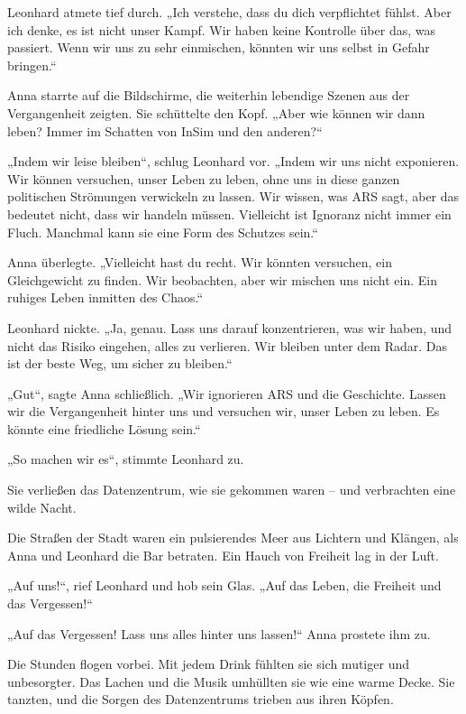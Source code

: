 \documentclass[
]{article}
\begin{document}
Leonhard atmete tief durch. „Ich verstehe, dass du dich verpflichtet fühlst. Aber ich denke, es ist nicht unser Kampf. Wir haben keine Kontrolle über das, was passiert. Wenn wir uns zu sehr einmischen, könnten wir uns selbst in Gefahr bringen.``

Anna starrte auf die Bildschirme, die weiterhin lebendige Szenen aus der Vergangenheit zeigten. Sie schüttelte den Kopf. „Aber wie können wir dann leben? Immer im Schatten von InSim und den anderen?{\kern0pt}``

„Indem wir leise bleiben``, schlug Leonhard vor. „Indem wir uns nicht exponieren. Wir können versuchen, unser Leben zu leben, ohne uns in diese ganzen politischen Strömungen verwickeln zu lassen. Wir wissen, was ARS sagt, aber das bedeutet nicht, dass wir handeln müssen. Vielleicht ist Ignoranz nicht immer ein Fluch. Manchmal kann sie eine Form des Schutzes sein.``

Anna überlegte. „Vielleicht hast du recht. Wir könnten versuchen, ein Gleichgewicht zu finden. Wir beobachten, aber wir mischen uns nicht ein. Ein ruhiges Leben inmitten des Chaos.``

Leonhard nickte. „Ja, genau. Lass uns darauf konzentrieren, was wir haben, und nicht das Risiko eingehen, alles zu verlieren. Wir bleiben unter dem Radar. Das ist der beste Weg, um sicher zu bleiben.``

„Gut``, sagte Anna schließlich. „Wir ignorieren ARS und die Geschichte. Lassen wir die Vergangenheit hinter uns und versuchen wir, unser Leben zu leben. Es könnte eine friedliche Lösung sein.``

„So machen wir es``, stimmte Leonhard zu.

Sie verließen das Datenzentrum, wie sie gekommen waren -- und verbrachten eine wilde Nacht.

Die Straßen der Stadt waren ein pulsierendes Meer aus Lichtern und Klängen, als Anna und Leonhard die Bar betraten. Ein Hauch von Freiheit lag in der Luft.

„Auf uns!{\kern0pt}``, rief Leonhard und hob sein Glas. „Auf das Leben, die Freiheit und das Vergessen!{\kern0pt}``

„Auf das Vergessen! Lass uns alles hinter uns lassen!{\kern0pt}`` Anna prostete ihm zu.

Die Stunden flogen vorbei. Mit jedem Drink fühlten sie sich mutiger und unbesorgter. Das Lachen und die Musik umhüllten sie wie eine warme Decke. Sie tanzten, und die Sorgen des Datenzentrums trieben aus ihren Köpfen.
\end{document}
